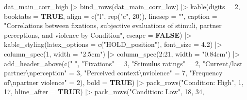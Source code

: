 \documentclass[
  bookmarksnumbered]{article}
\newenvironment{Shaded}{\begin{snugshade}}{\end{snugshade}}
\newcommand{\AttributeTok}[1]{\textcolor[rgb]{0.80,0.80,0.80}{#1}}
\newcommand{\ConstantTok}[1]{\textcolor[rgb]{0.86,0.64,0.64}{\textbf{#1}}}
\newcommand{\DecValTok}[1]{\textcolor[rgb]{0.86,0.86,0.80}{#1}}
\newcommand{\FloatTok}[1]{\textcolor[rgb]{0.75,0.75,0.82}{#1}}
\newcommand{\FunctionTok}[1]{\textcolor[rgb]{0.94,0.94,0.56}{#1}}
\newcommand{\NormalTok}[1]{\textcolor[rgb]{0.80,0.80,0.80}{#1}}
\newcommand{\OtherTok}[1]{\textcolor[rgb]{0.94,0.94,0.56}{#1}}
\newcommand{\SpecialCharTok}[1]{\textcolor[rgb]{0.86,0.64,0.64}{#1}}
\newcommand{\StringTok}[1]{\textcolor[rgb]{0.80,0.58,0.58}{#1}}
\begin{document}
\begin{Shaded}
\begin{Highlighting}[]
\NormalTok{dat\_main\_corr\_high }\SpecialCharTok{|\textgreater{}} 
  \FunctionTok{bind\_rows}\NormalTok{(dat\_main\_corr\_low) }\SpecialCharTok{|\textgreater{}} 
  \FunctionTok{kable}\NormalTok{(}\AttributeTok{digits =} \DecValTok{2}\NormalTok{,}
        \AttributeTok{booktabs =} \ConstantTok{TRUE}\NormalTok{,}
        \AttributeTok{align =} \FunctionTok{c}\NormalTok{(}\StringTok{"l"}\NormalTok{, }\FunctionTok{rep}\NormalTok{(}\StringTok{"c"}\NormalTok{, }\DecValTok{20}\NormalTok{)),}
        \AttributeTok{linesep =} \StringTok{""}\NormalTok{,}
        \AttributeTok{caption =} \StringTok{"Correlations between fixations, subjective evaluations of stimuli, }
\StringTok{        partner perceptions, and violence by Condition"}\NormalTok{,}
        \AttributeTok{escape =} \ConstantTok{FALSE}\NormalTok{) }\SpecialCharTok{|\textgreater{}}
  \FunctionTok{kable\_styling}\NormalTok{(}\AttributeTok{latex\_options =} \FunctionTok{c}\NormalTok{(}\StringTok{"HOLD\_position"}\NormalTok{),}
                \AttributeTok{font\_size =} \FloatTok{4.2}\NormalTok{) }\SpecialCharTok{|\textgreater{}}
  \FunctionTok{column\_spec}\NormalTok{(}\DecValTok{1}\NormalTok{, }\AttributeTok{width =} \StringTok{"2.5cm"}\NormalTok{) }\SpecialCharTok{|\textgreater{}}
  \FunctionTok{column\_spec}\NormalTok{(}\DecValTok{2}\SpecialCharTok{:}\DecValTok{21}\NormalTok{, }\AttributeTok{width =} \StringTok{"0.84cm"}\NormalTok{) }\SpecialCharTok{|\textgreater{}}
  \FunctionTok{add\_header\_above}\NormalTok{(}\FunctionTok{c}\NormalTok{(}\StringTok{" "}\NormalTok{, }
                     \StringTok{"Fixations"} \OtherTok{=} \DecValTok{3}\NormalTok{, }
                     \StringTok{"Stimulus ratings"} \OtherTok{=} \DecValTok{2}\NormalTok{,}
                     \StringTok{"Current/last partner}\SpecialCharTok{\textbackslash{}n}\StringTok{perception"} \OtherTok{=} \DecValTok{3}\NormalTok{,}
                     \StringTok{"Perceived context}\SpecialCharTok{\textbackslash{}n}\StringTok{violence"} \OtherTok{=} \DecValTok{7}\NormalTok{,}
                     \StringTok{"Frequency of}\SpecialCharTok{\textbackslash{}n}\StringTok{partner violence"} \OtherTok{=} \DecValTok{2}\NormalTok{),}
                   \AttributeTok{bold =} \ConstantTok{TRUE}\NormalTok{) }\SpecialCharTok{|\textgreater{}} 
  \FunctionTok{pack\_rows}\NormalTok{(}\StringTok{"Condition: High"}\NormalTok{, }\DecValTok{1}\NormalTok{, }\DecValTok{17}\NormalTok{,}
            \AttributeTok{hline\_after =} \ConstantTok{TRUE}\NormalTok{) }\SpecialCharTok{|\textgreater{}} 
  \FunctionTok{pack\_rows}\NormalTok{(}\StringTok{"Condition: Low"}\NormalTok{, }\DecValTok{18}\NormalTok{, }\DecValTok{34}\NormalTok{,}

\end{Highlighting}
\end{Shaded}
\end{document}
